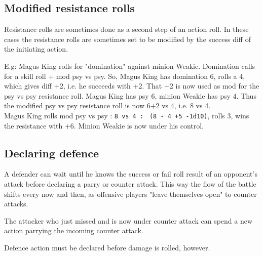 \subsection*{Modified resistance rolls}
Resistance rolls are sometimes done as a second step of an action roll. In these cases the resistance rolls are sometimes set to be modified by the success diff of the initiating action.

E.g: Magus King rolls for "domination" against minion Weakie. Domination calls for a skill roll + mod psy vs psy. So, Magus King has domination 6, rolls a 4, which gives diff +2, i.e. he succeeds with +2. That +2 is now used as mod for the psy vs psy resistance roll. Magus King has psy 6, minion Weakie has psy 4. Thus the modified psy vs psy resistance roll is now 6+2 vs 4, i.e. 8 vs 4.\\
Magus King rolls mod psy vs psy : \verb|8 vs 4 : | \verb|(8 - 4 +5 -1d10)|, rolls 3, wins the resistance with +6. Minion Weakie is now under his control.



\subsection*{Declaring defence}
A defender can wait until he knows the success or fail roll result of an opponent's attack before declaring a parry or counter attack. This way the flow of the battle shifts every now and then, as offensive players "leave themselves open" to counter attacks.

The attacker who just missed and is now under counter attack can spend a new action parrying the incoming counter attack.

Defence action must be declared before damage is rolled, however.


